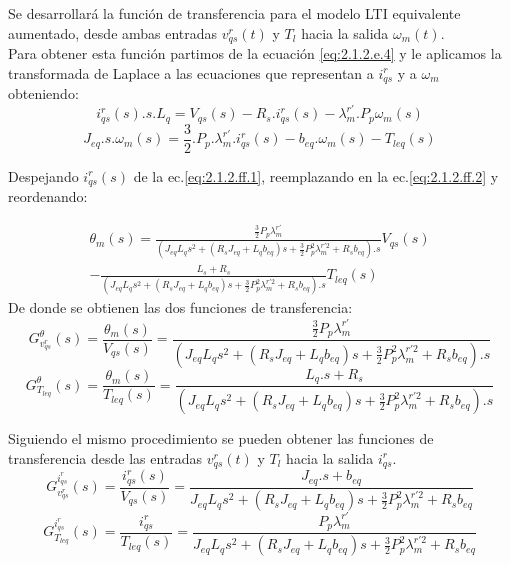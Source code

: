 \documentclass[10pt]{article}
\begin{document}
\begin{enumerate}
	Se desarrollará la función de transferencia para el modelo LTI equivalente aumentado, desde ambas entradas $v^{r}_{qs}(t)$ y $T_{l}$ hacia la salida $\omega_{m}(t)$.\\
	Para obtener esta función partimos de la ecuación \ref{eq:2.1.2.e.4} y le aplicamos la transformada de Laplace a las ecuaciones que representan a $i^{r}_{qs}$ y a $\omega_{m}$ obteniendo:
	\begin{equation}
	i^{r}_{qs}(s).s.L_{q}=V_{qs}(s)-R_{s}.i^{r}_{qs}(s)-\lambda^{r'}_{m}.P_{p}\omega_{m}(s)
	\label{eq:2.1.2.ff.1}
	\end{equation}
	\begin{equation}
	J_{eq}.s.\omega_{m}(s)=\frac{3}{2}.P_{p}.\lambda^{r'}_{m}.i^{r}_{qs}(s)-b_{eq}.\omega_{m}(s)-T_{leq}(s)
	\label{eq:2.1.2.ff.2}
	\end{equation}
	
Despejando $i^{r}_{qs}(s)$ de la ec.\ref{eq:2.1.2.ff.1}, reemplazando en la ec.\ref{eq:2.1.2.ff.2} y reordenando:

\begin{eqnarray}
	\theta_{m}(s)=\frac{\frac{3}{2}P_{p}\lambda^{r'}_{m}}{(J_{eq}L_{q}s^{2}+(R_{s}J_{eq}+L_{q}b_{eq})s + \frac{3}{2}P_{p}^{2}\lambda ^{r'2}_{m}+R_{s}b_{eq}).s} V_{qs}(s) \nonumber\\
	- \frac{L_{s}+R_{s}}{(J_{eq}L_{q}s^{2}+(R_{s}J_{eq}+L_{q}b_{eq})s + \frac{3}{2}P_{p}^{2}\lambda ^{r'2}_{m}+R_{s}b_{eq}).s} T_{leq}(s)
	\label{eq:2.1.2.ff.3}
	\end{eqnarray}
De donde se obtienen las dos funciones de transferencia:
\begin{equation}
	G^{\theta}_{v^{r}_{qs}}(s)=\frac{\theta_{m}(s)}{V_{qs}(s)}=\frac{\frac{3}{2}P_{p}\lambda^{r'}_{m}}{(J_{eq}L_{q}s^{2}+(R_{s}J_{eq}+L_{q}b_{eq})s + \frac{3}{2}P_{p}^{2}\lambda ^{r'2}_{m}+R_{s}b_{eq}).s}
	\label{eq:2.1.2.ff.4}
	\end{equation}
	\begin{equation}
	G^{\theta}_{T_{leq}}(s)=\frac{\theta_{m}(s)}{T_{leq}(s)}=\frac{L_{q}.s+R_{s}}{(J_{eq}L_{q}s^{2}+(R_{s}J_{eq}+L_{q}b_{eq})s + \frac{3}{2}P_{p}^{2}\lambda ^{r'2}_{m}+R_{s}b_{eq}).s}
	\label{eq:2.1.2.ff.5}
	\end{equation} 


Siguiendo el mismo procedimiento se pueden obtener las funciones de transferencia desde las entradas $v^{r}_{qs}(t)$ y $T_{l}$ hacia la salida $i^{r}_{qs}$.\\
\begin{equation}
	G^{i^{r}_{qs}}_{v^{r}_{qs}}(s)=\frac{i^{r}_{qs}(s)}{V_{qs}(s)}=\frac{J_{eq}.s+b_{eq}}{J_{eq}L_{q}s^{2}+(R_{s}J_{eq}+L_{q}b_{eq})s + \frac{3}{2}P_{p}^{2}\lambda ^{r'2}_{m}+R_{s}b_{eq}}
	\label{eq:2.1.2.ff.6}
	\end{equation}
	\begin{equation}
	G^{i^{r}_{qs}}_{T_{leq}}(s)=\frac{i^{r}_{qs}}{T_{leq}(s)}=\frac{P_{p}\lambda^{r'}_{m}}{J_{eq}L_{q}s^{2}+(R_{s}J_{eq}+L_{q}b_{eq})s + \frac{3}{2}P_{p}^{2}\lambda ^{r'2}_{m}+R_{s}b_{eq}}
	\label{eq:2.1.2.ff.7}
	\end{equation} 
\end{enumerate}
\end{document}
